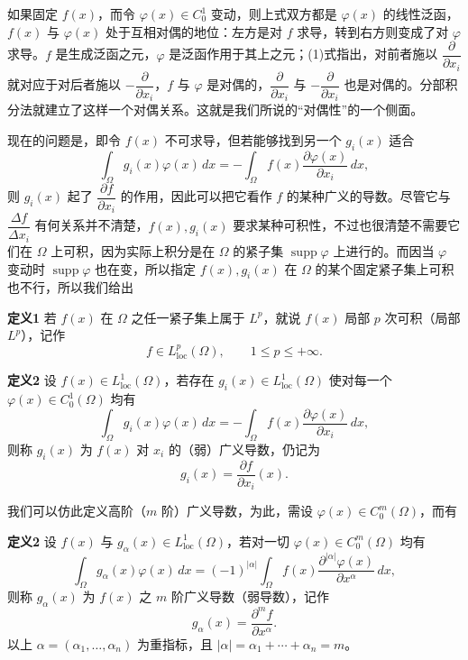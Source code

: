 如果固定 $f(x)$，而令 $\varphi(x)\in C_0^1$ 变动，则上式双方都是 $\varphi(x)$ 的线性泛函，$f(x)$ 与 $\varphi(x)$ 处于互相对偶的地位：左方是对 $f$ 求导，转到右方则变成了对 $\varphi$ 求导。$f$ 是生成泛函之元，$\varphi$ 是泛函作用于其上之元；(1)式指出，对前者施以 $\dfrac{\partial}{\partial x_i}$ 就对应于对后者施以 $-\dfrac{\partial}{\partial x_i}$，$f$ 与 $\varphi$ 是对偶的，$\dfrac{\partial}{\partial x_i}$ 与 $-\dfrac{\partial}{\partial x_i}$ 也是对偶的。分部积分法就建立了这样一个对偶关系。这就是我们所说的“对偶性”的一个侧面。

现在的问题是，即令 $f(x)$ 不可求导，但若能够找到另一个 $g_i(x)$ 适合
\[
 \int_\Omega g_i(x)\varphi(x)\,dx
 =-\int_\Omega f(x)\frac{\partial\varphi(x)}{\partial x_i}\,dx,
\]
则 $g_i(x)$ 起了 $\dfrac{\partial f}{\partial x_i}$ 的作用，因此可以把它看作 $f$ 的某种广义的导数。尽管它与 $\dfrac{\Delta f}{\Delta x_i}$ 有何关系并不清楚，$f(x),g_i(x)$ 要求某种可积性，不过也很清楚不需要它们在 $\Omega$ 上可积，因为实际上积分是在 $\Omega$ 的紧子集 $\operatorname{supp}\varphi$ 上进行的。而因当 $\varphi$ 变动时 $\operatorname{supp}\varphi$ 也在变，所以指定 $f(x),g_i(x)$ 在 $\Omega$ 的某个固定紧子集上可积也不行，所以我们给出

\noindent\textbf{定义1}
若 $f(x)$ 在 $\Omega$ 之任一紧子集上属于 $L^p$，就说 $f(x)$ 局部 $p$ 次可积（局部 $L^p$），记作
\[
 f\in L^p_{\mathrm{loc}}(\Omega),\qquad 1\le p\le+\infty.
\]

\noindent\textbf{定义2}
设 $f(x)\in L^1_{\mathrm{loc}}(\Omega)$，若存在 $g_i(x)\in L^1_{\mathrm{loc}}(\Omega)$ 使对每一个 $\varphi(x)\in C_0^1(\Omega)$ 均有
\begin{equation}
 \int_\Omega g_i(x)\varphi(x)\,dx
 =-\int_\Omega f(x)\frac{\partial\varphi(x)}{\partial x_i}\,dx,
 \tag{2}
\end{equation}
则称 $g_i(x)$ 为 $f(x)$ 对 $x_i$ 的（弱）广义导数，仍记为
\[
 g_i(x)=\frac{\partial f}{\partial x_i}(x).
\]

我们可以仿此定义高阶（$m$ 阶）广义导数，为此，需设 $\varphi(x)\in C_0^m(\Omega)$，而有

\noindent\textbf{定义2}
设 $f(x)$ 与 $g_\alpha(x)\in L^1_{\mathrm{loc}}(\Omega)$，若对一切 $\varphi(x)\in C_0^m(\Omega)$ 均有
\begin{equation}
 \int_\Omega g_\alpha(x)\varphi(x)\,dx
 =(-1)^{|\alpha|}\int_\Omega f(x)\frac{\partial^{|\alpha|}\varphi(x)}{\partial x^\alpha}\,dx,
 \tag{3}
\end{equation}
则称 $g_\alpha(x)$ 为 $f(x)$ 之 $m$ 阶广义导数（弱导数），记作
\[
 g_\alpha(x)=\frac{\partial^m f}{\partial x^\alpha}.
\]
以上 $\alpha=(\alpha_1,\ldots,\alpha_n)$ 为重指标，且 $|\alpha|=\alpha_1+\cdots+\alpha_n=m$。

